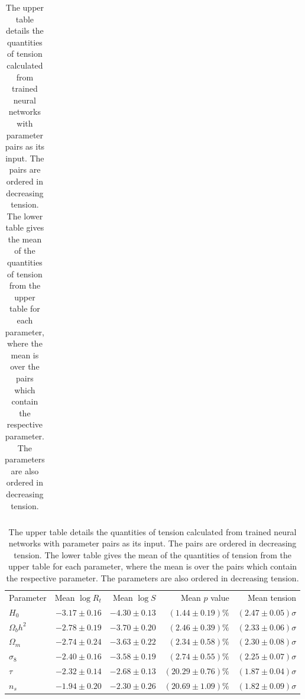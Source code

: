 \documentclass[%
 reprint,
 amsmath,amssymb,
 aps,
]{revtex4-2}
\begin{document}
\begin{table}
\begin{ruledtabular}
\begin{tabular}{l r r r r}
\end{tabular}
\rule{0pt}{5pt}
\begin{tabular}{l r r r r}
    Parameter & Mean $\log R_t$ & Mean $\log S$ & Mean $p$ value & Mean tension \\
    \colrule
    $H_0$           & $-3.17 \pm 0.16$ & $-4.30 \pm 0.13$ & $(1.44 \pm 0.19)\%$ & $(2.47 \pm 0.05)\sigma$ \\
    $\Omega_b h^2$  & $-2.78 \pm 0.19$ & $-3.70 \pm 0.20$ & $(2.46 \pm 0.39)\%$ & $(2.33 \pm 0.06)\sigma$ \\
    $\Omega_m$      & $-2.74 \pm 0.24$ & $-3.63 \pm 0.22$ & $(2.34 \pm 0.58)\%$ & $(2.30 \pm 0.08)\sigma$ \\
    $\sigma_8$      & $-2.40 \pm 0.16$ & $-3.58 \pm 0.19$ & $(2.74 \pm 0.55)\%$ & $(2.25 \pm 0.07)\sigma$ \\
    $\tau$          & $-2.32 \pm 0.14$ & $-2.68 \pm 0.13$ & $(20.29 \pm 0.76)\%$ & $(1.87 \pm 0.04)\sigma$ \\
    $n_s$           & $-1.94 \pm 0.20$ & $-2.30 \pm 0.26$ & $(20.69 \pm 1.09)\%$ & $(1.82 \pm 0.09)\sigma$ \\

\end{tabular}
\end{ruledtabular}
    
\caption{The upper table details the quantities of tension calculated from trained neural networks with parameter pairs as its input. The pairs are ordered in decreasing tension. The lower table gives the mean of the quantities of tension from the upper table for each parameter, where the mean is over the pairs which contain the respective parameter. The parameters are also ordered in decreasing tension.}
\label{table:pairwise}
\end{table}
\end{document}
